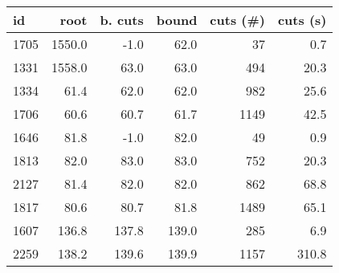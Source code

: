 \begin{tabular}{lrrrrr}
\toprule
   id &   root &  b. cuts &  bound &  cuts (\#) &  cuts (s) \\
\midrule
 1705 & 1550.0 &     -1.0 &   62.0 &        37 &       0.7 \\
 1331 & 1558.0 &     63.0 &   63.0 &       494 &      20.3 \\
 1334 &   61.4 &     62.0 &   62.0 &       982 &      25.6 \\
 1706 &   60.6 &     60.7 &   61.7 &      1149 &      42.5 \\
 1646 &   81.8 &     -1.0 &   82.0 &        49 &       0.9 \\
 1813 &   82.0 &     83.0 &   83.0 &       752 &      20.3 \\
 2127 &   81.4 &     82.0 &   82.0 &       862 &      68.8 \\
 1817 &   80.6 &     80.7 &   81.8 &      1489 &      65.1 \\
 1607 &  136.8 &    137.8 &  139.0 &       285 &       6.9 \\
 2259 &  138.2 &    139.6 &  139.9 &      1157 &     310.8 \\
\bottomrule
\end{tabular}
